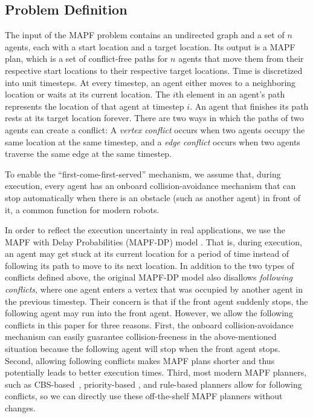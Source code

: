 \documentclass[letterpaper]{article} %
\theoremstyle{definition}
\begin{document}
\subsection{Problem Definition}
The input of the MAPF problem \cite{stern_multi-agent_2021} contains an undirected graph and a set of $n$ agents, each with a start location and a target location. Its output is a MAPF plan, which is a set of conflict-free paths for $n$ agents that move them from their respective start locations to their respective target locations. Time is discretized into unit timesteps. At every timestep, an agent either moves to a neighboring location or waits at its current location. The $i$th element in an agent's path represents the location of that agent at timestep $i$. An agent that finishes its path rests at its target location forever. There are two ways in which the paths of two agents can create a conflict: A \emph{vertex conflict} occurs when two agents occupy the same location at the same timestep, and a \emph{edge conflict} occurs when two agents traverse the same edge at the same timestep.  


To enable the ``first-come-first-served'' mechanism, we assume that, during execution, every agent has an onboard collision-avoidance mechanism that can stop automatically when there is an obstacle (such as another agent) in front of it, a common function for modern robots.

In order to reflect the execution uncertainty in real applications, we use the MAPF with Delay Probabilities (MAPF-DP) model \cite{ma_multi-agent_2017}. That is, during execution, an agent may get stuck at its current location for a period of time instead of following its path to move to its next location. In addition to the two types of conflicts defined above, the original MAPF-DP model also disallows \emph{following conflicts}, where one agent enters a vertex that was occupied by another agent in the previous timestep. Their concern is that if the front agent suddenly stops, the following agent may run into the front agent. However, we allow the following conflicts in this paper for three reasons. First, the onboard collision-avoidance mechanism can easily guarantee collision-freeness in the above-mentioned situation because the following agent will stop when the front agent stops. Second, allowing following conflicts makes MAPF plans shorter and thus potentially leads to better execution times. Third, most modern MAPF planners, such as CBS-based~\cite{sharon_conflict-based_2015,gange_lazy_2021,li_eecbs_2021}, priority-based \cite{erdmann_multiple_1986,ma_searching_2019}, and rule-based \cite{sajid_multi-agent_2021,okumura_priority_nodate} planners allow for following conflicts, so we can directly use these off-the-shelf MAPF planners without changes.  
\end{document}
